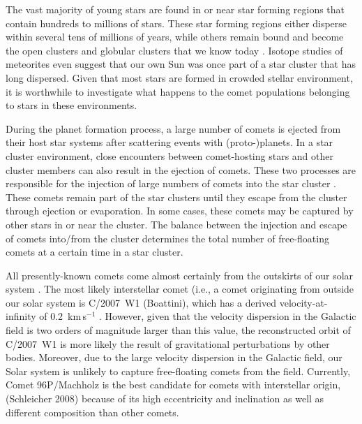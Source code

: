 \documentclass[usenatbib]{mnras}
\newcommand{\kms}{km\,s$^{-1}$}
\begin{document}
The vast majority of young stars are found in or near star forming regions that contain hundreds to millions of stars. These star forming regions either disperse within several tens of millions of years, while others remain bound and become the open clusters and globular clusters that we know today \citep[e.g.,][]{de-Grijs:2007aa}. Isotope studies of meteorites even suggest that our own Sun was once part of a star cluster that has long dispersed. Given that most stars are formed in crowded stellar environment, it is worthwhile to investigate what happens to the comet populations belonging to stars in these environments. 

During the planet formation process, a large number of comets is ejected from their host star systems after scattering events with (proto-)planets. In a star cluster environment, close encounters between comet-hosting stars and other cluster members can also result in the ejection of comets. These two processes are responsible for the injection of large numbers of comets into the star cluster \citep[e.g.,][]{Brasser:2015aa}. These comets remain part of the star clusters until they escape from the cluster through ejection or evaporation. In some cases, these comets may be captured by other stars in or near the cluster. The balance between the injection and escape of comets into/from the cluster determines the total number of free-floating comets at a certain time in a star cluster. 


All presently-known comets come almost certainly from the outskirts of our solar system \citep{Dones:2015aa}. The most likely interstellar comet (i.e., a comet originating from outside our solar system is C/2007~W1 (Boattini), which has a derived velocity-at-infinity of 0.2~\kms{} \citep{Dybczynski:2015aa}. However, given that the velocity dispersion in the Galactic field is two orders of magnitude larger than this value, the reconstructed orbit of C/2007~W1 is more likely the result of gravitational perturbations by other bodies. Moreover, due to the large velocity dispersion in the Galactic field, our Solar system is unlikely to capture free-floating comets from the field. Currently, Comet 96P/Machholz is the best candidate for comets with interstellar origin, (Schleicher 2008) because of its high eccentricity and inclination as well as different composition than other comets.
\end{document}
